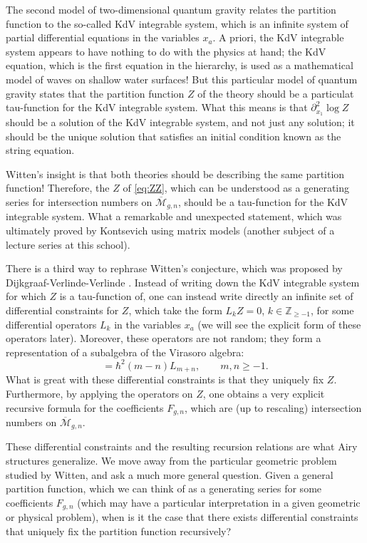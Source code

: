 \documentclass[reqno,oneside,11pt]{amsart}
\theoremstyle{plain}
\theoremstyle{definition}
\theoremstyle{remark}
\numberwithin{equation}{section}
\begin{document}
The second model of two-dimensional quantum gravity relates the partition function to the so-called KdV integrable system, which is an infinite system of partial differential equations in the variables $x_a$. A priori, the KdV integrable system appears to have nothing to do with the physics at hand; the KdV equation, which is the first equation in the hierarchy, is used as a mathematical model of waves on shallow water surfaces! But this particular model of quantum gravity states that the partition function $Z$ of the theory should be a particulat tau-function for the KdV integrable system. What this means is that $\partial_{x_1}^2 \log Z$ should be a solution of the KdV integrable system, and not just any solution; it should be the unique solution that satisfies an initial condition known as the string equation.

Witten's insight is that both theories should be describing the same partition function! Therefore, the $Z$ of \eqref{eq:ZZ}, which can be understood as a generating series for intersection numbers on $\overline{\mathcal{M}}_{g,n}$, should be a tau-function for the KdV integrable system. What a remarkable and unexpected statement, which was ultimately proved by Kontsevich using matrix models (another subject of a lecture series at this school).

There is a third way to rephrase Witten's conjecture, which was proposed by Dijkgraaf-Verlinde-Verlinde \cite{DVV91}. Instead of writing down the KdV integrable system for which $Z$ is a tau-function of, one can instead write directly an infinite set of differential constraints for $Z$, which take the form $L_k Z = 0$, $k \in \mathbb{Z}_{\geq -1}$, for some differential operators $L_k$ in the variables $x_a$ (we will see the explicit form of these operators later). Moreover, these operators are not random; they form a representation of a subalgebra of the Virasoro algebra:
\begin{equation}
[L_m, L_n] = \hbar^2 (m-n) L_{m+n}, \qquad m,n \geq -1.
\end{equation}
What is great with these differential constraints is that they uniquely fix $Z$. Furthermore, by applying the operators on $Z$, one obtains a very explicit recursive formula for the coefficients $F_{g,n}$, which are (up to rescaling) intersection numbers on $\overline{\mathcal{M}}_{g,n}$.

These differential constraints and the resulting recursion relations are what Airy structures generalize. We move away from the particular geometric problem studied by Witten, and ask a much more general question. Given a general partition function, which we can think of as a generating series for some coefficients $F_{g,n}$ (which may have a particular interpretation in a given geometric or physical problem), when is it the case that there exists differential constraints that uniquely fix the partition function recursively?
\end{document}
